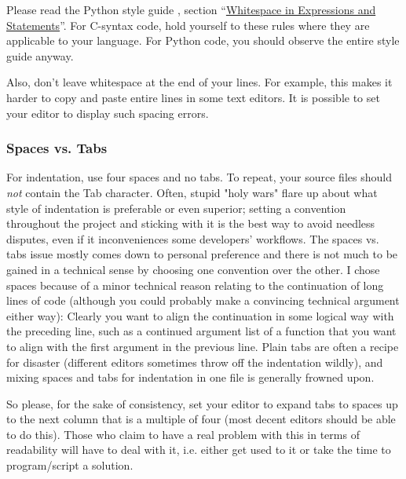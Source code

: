 \documentclass[12pt]{article}
\begin{document}
Please read the Python style guide \cite{pyguide}, section ``\href{http://www.python.org/dev/peps/pep-0008/#whitespace-in-expressions-and-statements}{Whitespace in Expressions and Statements}''. For C-syntax code, hold yourself to these rules where they are applicable to your language. For Python code, you should observe the entire style guide anyway.

Also, don't leave whitespace at the end of your lines. For example, this makes it harder to copy and paste entire lines in some text editors. It is possible to set your editor to display such spacing errors.

\subsubsection{Spaces vs. Tabs}
For indentation, use four spaces and no tabs. To repeat, your source files should \emph{not} contain the Tab character. Often, stupid "holy wars" flare up about what style of indentation is preferable or even superior; setting a convention throughout the project and sticking with it is the best way to avoid needless disputes, even if it inconveniences some developers' workflows. The spaces vs. tabs issue mostly comes down to personal preference and there is not much to be gained in a technical sense by choosing one convention over the other. I chose spaces because of a minor technical reason relating to the continuation of long lines of code (although you could probably make a convincing technical argument either way): Clearly you want to align the continuation in some logical way with the preceding line, such as a continued argument list of a function that you want to align with the first argument in the previous line. Plain tabs are often a recipe for disaster (different editors sometimes throw off the indentation wildly), and mixing spaces and tabs for indentation in one file is generally frowned upon.

So please, for the sake of consistency, set your editor to expand tabs to spaces up to the next column that is a multiple of four (most decent editors should be able to do this). Those who claim to have a real problem with this in terms of readability will have to deal with it, i.e. either get used to it or take the time to program/script a solution.
\end{document}
